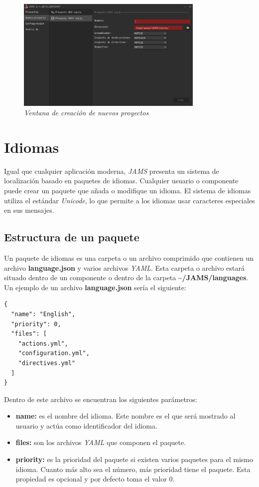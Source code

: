 \begin{figure}[H]
    \centering
    \includegraphics[width=0.8\textwidth]{images/base/jams-main-new-project}
    \caption{\textit{Ventana de creación de nuevos proyectos}}
    \label{fig:jams-main-new-project}
\end{figure}


\section{Idiomas}\label{sec:idiomas}

Igual que cualquier aplicación moderna, \textit{JAMS} presenta un sistema de
localización basado en paquetes de idiomas.
Cualquier usuario o componente puede crear un paquete que añada
o modifique un idioma.
El sistema de idiomas utiliza el estándar \textit{Unicode}, lo que permite
a los idiomas usar caracteres especiales en sus mensajes.

\subsection{Estructura de un paquete}\label{subsec:estructura-de-un-paquete}

Un paquete de idiomas es una carpeta o un archivo comprimido
que contienen un archivo \textbf{language.json}
y varios archivos \textit{YAML}\cite{YAML}.
Esta carpeta o archivo estará situado dentro de un componente
o dentro de la carpeta \textbf{\textasciitilde/JAMS/languages}.
Un ejemplo de un archivo \textbf{language.json} sería el siguiente:

\begin{lstlisting}[frame=single,label={lst:language.json}]
{
  "name": "English",
  "priority": 0,
  "files": [
    "actions.yml",
    "configuration.yml",
    "directives.yml"
  ]
}
\end{lstlisting}

Dentro de este archivo se encuentran los siguientes parámetros:
\begin{itemize}
    \item \textbf{name:} es el nombre del idioma.
    Este nombre es el que será mostrado al usuario
    y actúa como identificador del idioma.
    \item \textbf{files:} son los archivos \textit{YAML} que componen el paquete.
    \item \textbf{priority:} es la prioridad del paquete si existen varios
    paquetes para el mismo idioma.
    Cuanto más alto sea el número, más prioridad tiene el paquete.
    Esta propiedad es opcional y por defecto toma el valor 0.
\end{itemize}

